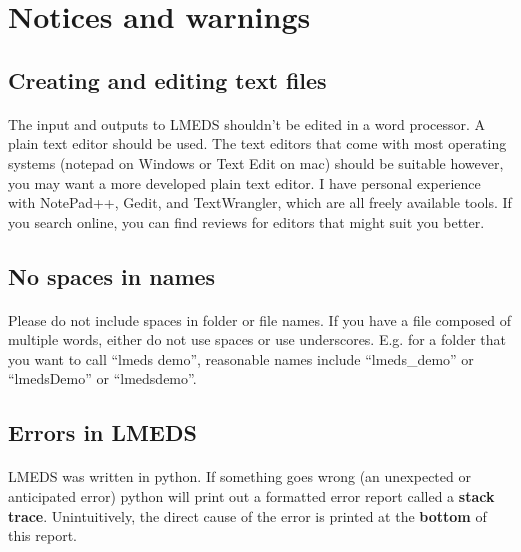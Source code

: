 
\section{Notices and warnings}

\subsection{Creating and editing text files}

\paragraph{}

The input and outputs to LMEDS shouldn't be edited in a word processor.  A plain text editor should be used.  The text editors that come with most operating systems (notepad on Windows or Text Edit on mac) should be suitable however, you may want a more developed plain text editor.  I have personal experience with NotePad++, Gedit, and TextWrangler, which are all freely available tools.  If you search online, you can find reviews for editors that might suit you better.

\subsection{No spaces in names}

\paragraph{}

Please do not include spaces in folder or file names.  If you have a file composed of multiple words, either do not use spaces or use underscores.  E.g. for a folder that you want to call ``lmeds demo'', reasonable names include ``lmeds\_demo'' or ``lmedsDemo'' or ``lmedsdemo''.

\subsection{Errors in LMEDS}

\paragraph{}

LMEDS was written in python.  If something goes wrong (an unexpected or anticipated error) python will print out a formatted error report called a \textbf{stack trace}.  Unintuitively, the direct cause of the error is printed at the \textbf{bottom} of this report.  

